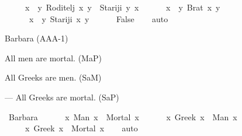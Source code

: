 \begin{isabellebody}
\begin{exercise}[subtitle=Zapisivanje logičkih formula (nastavak)]
\ \ \ \ {\isacharparenleft}{\kern0pt}{\isasymforall}\ x{\isachardot}{\kern0pt}\ {\isasymforall}\ y{\isachardot}{\kern0pt}\ Roditelj\ x\ y\ {\isasymlongrightarrow}\ Stariji\ y\ x{\isacharparenright}{\kern0pt}\ {\isasymand}\isanewline
\ \ \ \ {\isacharparenleft}{\kern0pt}{\isasymexists}\ x{\isachardot}{\kern0pt}\ {\isasymexists}\ y{\isachardot}{\kern0pt}\ Brat\ x\ y{\isacharparenright}{\kern0pt}\ {\isasymand}\isanewline
\ \ \ \ {\isacharparenleft}{\kern0pt}{\isasymnot}\ {\isacharparenleft}{\kern0pt}{\isasymexists}\ x{\isachardot}{\kern0pt}\ {\isasymexists}\ y{\isachardot}{\kern0pt}\ Stariji\ x\ y{\isacharparenright}{\kern0pt}{\isacharparenright}{\kern0pt}\ {\isasymlongrightarrow}\ \isanewline
\ \ \ \ False{\isachardoublequoteclose}\isanewline
%
\isadelimproof
\ \ %
\endisadelimproof
%
\isatagproof
{}\isamarkupfalse%
\ auto%
\endisatagproof
{\isafoldproof}%
%
\isadelimproof
%
\endisadelimproof
%
\end{exercise}
%
\begin{exercise}[subtitle=Silogizmi]
%
\begin{isamarkuptext}%
Barbara (AAA-1)%
\end{isamarkuptext}\isamarkuptrue%
%
\begin{isamarkuptext}%
All men are mortal. (MaP)%
\end{isamarkuptext}\isamarkuptrue%
%
\begin{isamarkuptext}%
All Greeks are men. (SaM)%
\end{isamarkuptext}\isamarkuptrue%
%
\begin{isamarkuptext}%
— All Greeks are mortal. (SaP)%
\end{isamarkuptext}\isamarkuptrue%
\isamarkupfalse%
\ Barbara{\isacharcolon}{\kern0pt}\ {\isachardoublequoteopen}\isanewline
\ \ \ \ {\isacharparenleft}{\kern0pt}{\isasymforall}\ x{\isachardot}{\kern0pt}\ Man\ x\ {\isasymlongrightarrow}\ Mortal\ x{\isacharparenright}{\kern0pt}\ {\isasymand}\isanewline
\ \ \ \ {\isacharparenleft}{\kern0pt}{\isasymforall}\ x{\isachardot}{\kern0pt}\ Greek\ x\ {\isasymlongrightarrow}\ Man\ x{\isacharparenright}{\kern0pt}\ {\isasymlongrightarrow}\isanewline
\ \ \ \ {\isacharparenleft}{\kern0pt}{\isasymforall}\ x{\isachardot}{\kern0pt}\ Greek\ x\ {\isasymlongrightarrow}\ Mortal\ x{\isacharparenright}{\kern0pt}{\isachardoublequoteclose}\isanewline
%
\isadelimproof
\ \ %
\endisadelimproof
%
\isatagproof
{}\isamarkupfalse%
\ auto%
\endisatagproof
{\isafoldproof}%
%
\isadelimproof
%
\endisadelimproof
%
\begin{isamarkuptext}%

\end{isamarkuptext}
\end{exercise}
\end{isabellebody}
